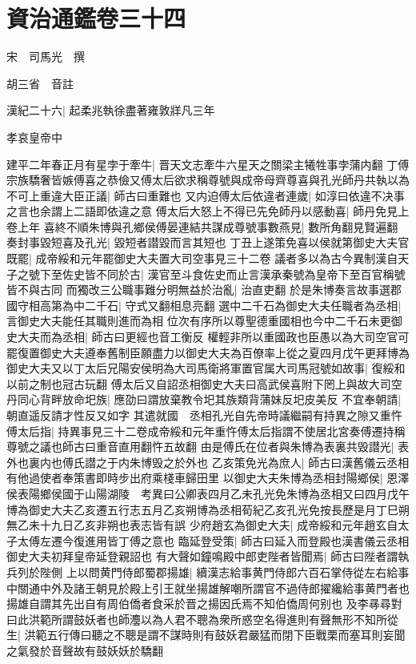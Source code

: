 \section{資治通鑑卷三十四}
宋　司馬光　撰

胡三省　音註

漢紀二十六|{
	起柔兆執徐盡著雍敦牂凡三年}


孝哀皇帝中

建平二年春正月有星孛于牽牛|{
	晋天文志牽牛六星天之關梁主犧牲事孛蒲内翻}
丁傅宗族驕奢皆嫉傅喜之恭儉又傅太后欲求稱尊號與成帝母齊尊喜與孔光師丹共執以為不可上重違大臣正議|{
	師古曰重難也}
又内迫傅太后依違者連歲|{
	如淳曰依違不决事之言也余謂上二語即依違之意}
傅太后大怒上不得已先免師丹以感動喜|{
	師丹免見上卷上年}
喜終不順朱博與孔鄉侯傅晏連結共謀成尊號事數燕見|{
	數所角翻見賢遍翻}
奏封事毀短喜及孔光|{
	毀短者譛毀而言其短也}
丁丑上遂策免喜以侯就第御史大夫官既罷|{
	成帝綏和元年罷御史大夫置大司空事見三十二卷}
議者多以為古今異制漢自天子之號下至佐史皆不同於古|{
	漢官至斗食佐史而止言漢承秦號為皇帝下至百官稱號皆不與古同}
而獨改三公職事難分明無益於治亂|{
	治直吏翻}
於是朱博奏言故事選郡國守相高第為中二千石|{
	守式又翻相息亮翻}
選中二千石為御史大夫任職者為丞相|{
	言御史大夫能任其職則進而為相}
位次有序所以尊聖德重國相也今中二千石未更御史大夫而為丞相|{
	師古曰更經也音工衡反}
權輕非所以重國政也臣愚以為大司空官可罷復置御史大夫遵奉舊制臣願盡力以御史大夫為百僚率上從之夏四月戊午更拜博為御史大夫又以丁太后兄陽安侯明為大司馬衛將軍置官属大司馬冠號如故事|{
	復綏和以前之制也冠古玩翻}
傅太后又自詔丞相御史大夫曰高武侯喜附下罔上與故大司空丹同心背畔放命圯族|{
	應劭曰謂放棄教令圯其族類背蒲妹反圯皮美反}
不宜奉朝請|{
	朝直遥反請才性反又如字}
其遣就國　丞相孔光自先帝時議繼嗣有持異之隙又重忤傅太后指|{
	持異事見三十二卷成帝綏和元年重忤傅太后指謂不使居北宮奏傅遷持稱尊號之議也師古曰重音直用翻忤五故翻}
由是傅氏在位者與朱博為表裏共毁譛光|{
	表外也裏内也傅氏譛之于内朱博毁之於外也}
乙亥策免光為庶人|{
	師古曰漢舊儀云丞相有他過使者奉策書即時步出府乘棧車歸田里}
以御史大夫朱博為丞相封陽鄉侯|{
	恩澤侯表陽鄉侯國于山陽湖陵　考異曰公卿表四月乙未孔光免朱博為丞相又曰四月戊午博為御史大夫乙亥遷五行志五月乙亥朔博為丞相荀紀乙亥孔光免按長歷是月丁巳朔無乙未十九日乙亥非朔也表志皆有誤}
少府趙玄為御史大夫|{
	成帝綏和元年趙玄自太子太傅左遷今復進用皆丁傅之意也}
臨延登受策|{
	師古曰延入而登殿也漢書儀云丞相御史大夫初拜皇帝延登親詔也}
有大聲如鐘鳴殿中郎吏陛者皆聞焉|{
	師古曰陛者謂執兵列於陛側}
上以問黄門侍郎蜀郡揚雄|{
	續漢志給事黄門侍郎六百石掌侍從左右給事中關通中外及諸王朝見於殿上引王就坐揚雄解嘲所謂官不過侍郎擢纔給事黄門者也揚雄自謂其先出自有周伯僑者食采於晋之揚因氏焉不知伯僑周何别也}
及李㝷尋對曰此洪範所謂鼓妖者也師灋以為人君不聰為衆所惑空名得進則有聲無形不知所從生|{
	洪範五行傳曰聽之不聰是謂不謀時則有鼓妖君嚴猛而閉下臣戰栗而塞耳則妄聞之氣發於音聲故有鼓妖妖於驕翻}
